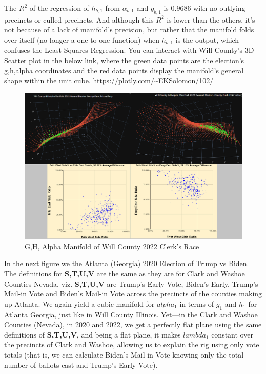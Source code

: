 The $R^2$ of the regression of $h_{b,1}$ from $\alpha_{b,1}$ and $g_{b,1}$ is 0.9686 with no outlying precincts or culled precincts. And although this $R^2$ is lower than the others, it's not because of a lack of manifold's precision, but rather that the manifold folds over itself (no longer a one-to-one function) when $h_{b,1}$ is the output, which confuses the Least Squares Regression. 
You can interact with Will County's 3D Scatter plot in the below link, where the green data points are the election's g,h,alpha coordinates and the red data points display the manifold's general shape within the unit cube. \url{https://plotly.com/~EKSolomon/102/}
\begin{figure}[bp!]
\begin{center}
\caption{G,H, Alpha Manifold of Will County 2022 Clerk's Race}
\includegraphics[width=400pt]{will county latex.png}
\end{center}
\end{figure}
\newpage
In the next figure we the Atlanta (Georgia) 2020 Election of Trump vs Biden. The definitions for \textbf{S,T,U,V} are the same as they are for Clark and Washoe Counties Nevada, viz. \textbf{S,T,U,V} are Trump's Early Vote, Biden's Early, Trump's Mail-in Vote and Biden's Mail-in Vote across the precincts of the counties making up Atlanta. We again yield a cubic manifold for $alpha_{1}$ in terms of $g_{1}$ and $h_{1}$ for Atlanta Georgia, just like in Will County Illinois. Yet---in the Clark and Washoe Counties (Nevada), in 2020 and 2022, we get a perfectly flat plane using the same definitions of \textbf{S,T,U,V}, and being a flat plane, it makes $lambda_{1}$ constant over the precincts of Clark and Washoe, allowing us to explain the rig using only vote totals (that is, we can calculate Biden's Mail-in Vote knowing only the total number of ballots cast and Trump's Early Vote).

